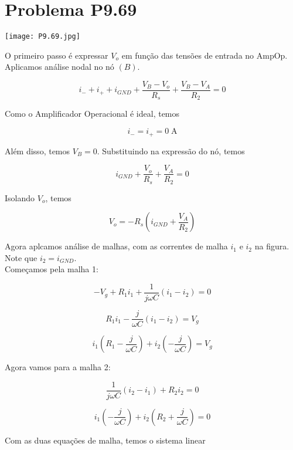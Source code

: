 \section*{Problema P9.69}

\renewcommand*\thesection{9.69}

\begin{center}
    \texttt{[image: P9.69.jpg]}
\end{center}

O primeiro passo é expressar $V_o$ em função das tensões de entrada no AmpOp.
Aplicamos análise nodal no nó $(B)$.

\[ i_- + i_+ + i_{GND} + \frac{V_B - V_o}{R_s} + \frac{V_B - V_A}{R_2} = 0 \]

Como o Amplificador Operacional é ideal, temos

\begin{equation}\label{eq:9.69.1}
    i_- = i_+ = 0 \; \textrm{A}
\end{equation}

Além disso, temos $V_B = 0$. Substituindo na expressão do nó, temos

\[ i_{GND} + \frac{V_o}{R_s} + \frac{V_A}{R_2} = 0 \]

Isolando $V_o$, temos

\begin{equation}\label{eq:9.69.2}
    V_o = - R_s\left(i_{GND} + \frac{V_A}{R_2}\right)
\end{equation}

Agora aplcamos análise de malhas, com as correntes de malha $i_1$ e $i_2$ na figura. Note que $i_2 = i_{GND}$. \\
Começamos pela malha 1:

\[ -V_g + R_1i_1 + \frac{1}{j\omega C}(i_1 - i_2) = 0 \]

\[ R_1i_1 - \frac{j}{\omega C}(i_1 - i_2) = V_g \]

\[ i_1\left(R_1 - \frac{j}{\omega C}\right) + i_2\left(- \frac{j}{\omega C}\right) = V_g \]

Agora vamos para a malha 2:

\[ \frac{1}{j\omega C}(i_2 - i_1) + R_2i_2 = 0 \]

\[ i_1\left(- \frac{j}{\omega C}\right) + i_2\left(R_2 + \frac{j}{\omega C}\right) = 0 \]

Com as duas equações de malha, temos o sistema linear

